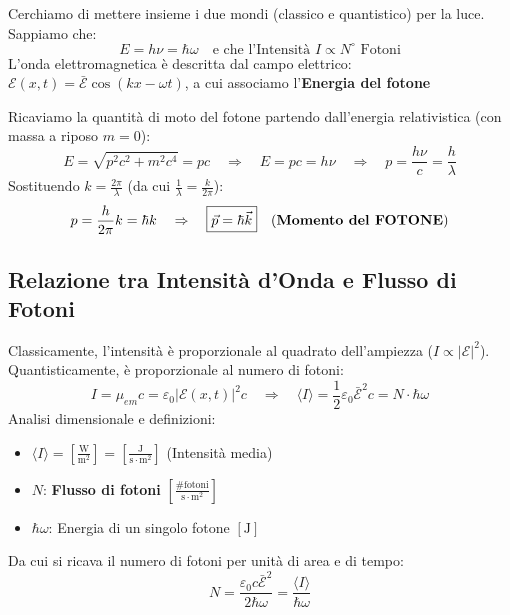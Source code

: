 \documentclass[11pt, a4paper]{article}
\begin{document}
Cerchiamo di mettere insieme i due mondi (classico e quantistico) per la luce. %
Sappiamo che:
\begin{equation*}
    E = h\nu = \hbar\omega \quad \text{e che l'Intensità } I \propto N^\circ \text{ Fotoni} %
\end{equation*}
L'onda elettromagnetica è descritta dal campo elettrico: $\mathcal{E}(x,t) = \bar{\mathcal{E}} \cos(kx - \omega t)$, a cui associamo l'\textbf{Energia del fotone} %

\noindent
Ricaviamo la quantità di moto del fotone partendo dall'energia relativistica (con massa a riposo $m=0$): %
\begin{equation*}
    E = \sqrt{p^2 c^2 + m^2 c^4} = pc \quad \Rightarrow \quad E = pc = h\nu \quad \Rightarrow \quad p = \frac{h\nu}{c} = \frac{h}{\lambda} %
\end{equation*}
Sostituendo $k = \frac{2\pi}{\lambda}$ (da cui $\frac{1}{\lambda} = \frac{k}{2\pi}$): %
\begin{equation*}
    p = \frac{h}{2\pi} k = \hbar k \quad \Rightarrow \quad \boxed{ \vec{p} = \hbar \vec{k} } \quad \text{(\textbf{Momento del FOTONE})} %
\end{equation*}

\subsection{Relazione tra Intensità d'Onda e Flusso di Fotoni} %

Classicamente, l'intensità è proporzionale al quadrato dell'ampiezza ($I \propto |\mathcal{E}|^2$). Quantisticamente, è proporzionale al numero di fotoni: %
\begin{equation*}
    I = \mu_{em} c = \varepsilon_0 |\mathcal{E}(x,t)|^2 c \quad \Rightarrow \quad \langle I \rangle = \frac{1}{2} \varepsilon_0 \bar{\mathcal{E}}^2 c = N \cdot \hbar\omega %
\end{equation*}
Analisi dimensionale e definizioni: %
\begin{itemize}
    \item $\langle I \rangle = \left[ \frac{\text{W}}{\text{m}^2} \right] = \left[ \frac{\text{J}}{\text{s} \cdot \text{m}^2} \right]$ (Intensità media) %
    \item $N$: \textbf{Flusso di fotoni} $\left[ \frac{\text{\# fotoni}}{\text{s} \cdot \text{m}^2} \right]$ %
    \item $\hbar\omega$: Energia di un singolo fotone $[\text{J}]$ %
\end{itemize}
Da cui si ricava il numero di fotoni per unità di area e di tempo: %
\begin{equation}
    N = \frac{\varepsilon_0 c \bar{\mathcal{E}}^2}{2 \hbar\omega} = \frac{\langle I \rangle}{\hbar\omega} %
\end{equation}
\end{document}
